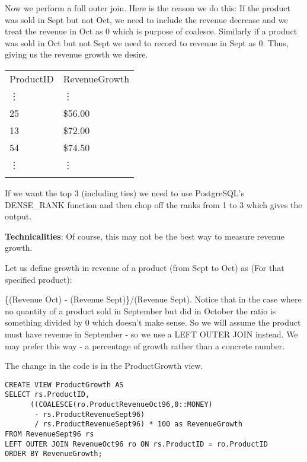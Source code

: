 \documentclass[11pt]{exam}
\newcommand{\headcol}{\rowcolor{tableheadcolor}} %
\newcommand{\topline}{\arrayrulecolor{black}\specialrule{0.1em}{\abovetopsep}{0pt}%
            \arrayrulecolor{tableheadcolor}\specialrule{\belowrulesep}{0pt}{0pt}%
            \arrayrulecolor{black}}
\newcommand{\midline}{\arrayrulecolor{tableheadcolor}\specialrule{\aboverulesep}{0pt}{0pt}%
            \arrayrulecolor{black}\specialrule{\lightrulewidth}{0pt}{0pt}%
            \arrayrulecolor{white}\specialrule{\belowrulesep}{0pt}{0pt}%
            \arrayrulecolor{black}}
\newcommand{\bottomlinec}{\arrayrulecolor{tablerowcolor}\specialrule{\aboverulesep}{0pt}{0pt}%
            \arrayrulecolor{black}\specialrule{\heavyrulewidth}{0pt}{\belowbottomsep}}%
\begin{document}
\begin{questions}
\begin{solution}
{Now we perform a full outer join. Here is the reason we do this: If the product was sold in Sept but not Oct, we need to include the revenue decrease and we treat the revenue in Oct as 0 which is purpose of coalesce. Similarly if a product was sold in Oct but not Sept we need to record to revenue in Sept as 0. Thus, giving us the revenue growth we desire. 


\begin{center}
\renewcommand{\arraystretch}{1.5}
\begin{tabular}{p{2cm} p{4cm}}
  \topline
  \headcol ProductID & RevenueGrowth\\
  \midline
   \vdots & \vdots\\
   25 & \$56.00\\
   13& \$72.00\\
    54& \$74.50\\
   \vdots & \vdots \\
  \bottomlinec
\end{tabular}
\end{center}


 If we want the top 3 (including ties) we need to use PostgreSQL's DENSE\_RANK function and then chop off the ranks from 1 to 3 which gives the output.


{\bfseries Technicalities}: Of course, this may not be the best way to measure revenue growth.

Let us define growth in revenue of a product (from Sept to Oct) as (For that specified product):

\{(Revenue Oct) - (Revenue Sept)\}/(Revenue Sept). Notice that in the case where no quantity of a product sold in September but did in October the ratio is something divided by 0 which doesn't make sense. So we will assume the product must have revenue in September - so we use a LEFT OUTER JOIN instead. We may prefer this way - a percentage of growth rather than a concrete number. 

The change in the code is in the ProductGrowth view.

\begin{myfont}
\begin{lstlisting}
CREATE VIEW ProductGrowth AS
SELECT rs.ProductID,
      ((COALESCE(ro.ProductRevenueOct96,0::MONEY)
	   - rs.ProductRevenueSept96)
       / rs.ProductRevenueSept96) * 100 as RevenueGrowth
FROM RevenueSept96 rs 
LEFT OUTER JOIN RevenueOct96 ro ON rs.ProductID = ro.ProductID
ORDER BY RevenueGrowth;
\end{lstlisting}
\end{myfont}

}
\end{solution}
\end{questions}
\end{document}
